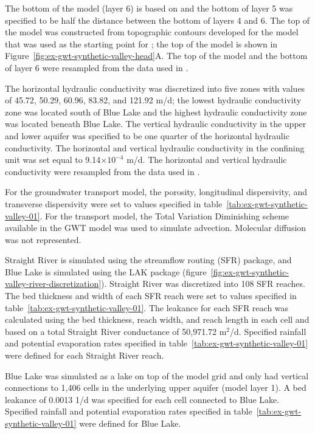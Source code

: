 The bottom of the model (layer 6) is based on \cite{hill1998controlled} and the bottom of layer 5 was specified to be half the distance between the bottom of layers 4 and 6. The top of the model was constructed from topographic contours developed for the model that was used as the starting point for \cite{hill1998controlled}; the top of the model is shown in Figure~\ref{fig:ex-gwt-synthetic-valley-head}A. The top of the model and the bottom of layer 6 were resampled from the data used in \cite{hill1998controlled}.

The horizontal hydraulic conductivity was discretized into five zones with values of 45.72, 50.29, 60.96, 83.82, and 121.92 m/d; the lowest hydraulic conductivity zone was located south of Blue Lake and the highest hydraulic conductivity zone was located beneath Blue Lake. The vertical hydraulic conductivity in the upper and lower aquifer was specified to be one quarter of the horizontal hydraulic conductivity. The horizontal and vertical hydraulic conductivity in the confining unit was set equal to 9.14$\times10^{-4}$ m/d. The horizontal and vertical hydraulic conductivity were resampled from the data used in \cite{hill1998controlled}.

For the groundwater transport model, the porosity, longitudinal dispersivity, and transverse dispersivity were set to values specified in table~\ref{tab:ex-gwt-synthetic-valley-01}. For the transport model, the Total Variation Diminishing scheme available in the GWT model \citep{modflow6gwt} was used to simulate advection. Molecular diffusion was not represented.

Straight River is simulated using the streamflow routing (SFR) package, and Blue Lake is simulated using the LAK package (figure~\ref{fig:ex-gwt-synthetic-valley-river-discretization}). Straight River was discretized into 108 SFR reaches. The bed thickness and width of each SFR reach were set to values specified in table~\ref{tab:ex-gwt-synthetic-valley-01}. The leakance for each SFR reach was calculated using the bed thickness, reach width, and reach length in each cell and based on a total Straight River conductance of 50,971.72 m$^2$/d. Specified rainfall and potential evaporation rates specified in table~\ref{tab:ex-gwt-synthetic-valley-01} were defined for each Straight River reach.

Blue Lake was simulated as a lake on top of the model grid and only had vertical connections to 1,406 cells in the underlying upper aquifer (model layer 1). A bed leakance of 0.0013 1/d was specified for each cell connected to Blue Lake. Specified rainfall and potential evaporation rates specified in table~\ref{tab:ex-gwt-synthetic-valley-01} were defined for Blue Lake.

